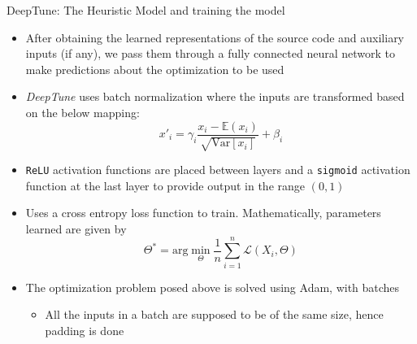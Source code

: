 \documentclass[10pt]{beamer}
\begin{document}
\begin{frame}{DeepTune: The Heuristic Model and training the model}
\begin{itemize}
\item<1->{After obtaining the learned representations of the source code and auxiliary inputs (if any), we pass them through a fully connected neural network to make predictions about the optimization to be used}
\item<2->{\emph{DeepTune} uses batch normalization where the inputs are transformed based on the below mapping:
          \vspace{-4mm}\[x'_{i} = \gamma_{i}\displaystyle\frac{x_{i} - \mathbb{E}(x_{i})}{\sqrt{\mathrm{Var}[x_{i}]}} + \beta_{i}\]}
\item<3->{\texttt{ReLU} activation functions are placed between layers and a \texttt{sigmoid} activation function at the last layer to provide output in the range \((0, 1)\)}
\item<4->{Uses a cross entropy loss function to train. Mathematically, parameters learned are given by
\vspace{-5mm}\[\Theta^{*} = \mathrm{arg}\min_{\Theta} \displaystyle \frac{1}{n}\sum_{i=1}^{n}\mathcal{L}(X_{i}, \Theta)\]}
\vspace{-5mm}
\item<5->{The optimization problem posed above is solved using Adam, with batches
          \begin{itemize}
          \item<6->{All the inputs in a batch are supposed to be of the same size, hence padding is done}
          \end{itemize}}
\end{itemize}
\end{frame}
\end{document}
